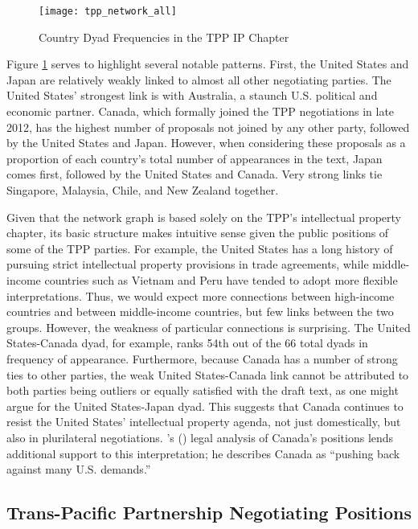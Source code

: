 \documentclass[12pt]{article}
\def\citeapos#1{\citeauthor{#1}'s (\citeyear{#1})}
\begin{document}
\begin{figure}
\caption{Country Dyad Frequencies in the TPP IP Chapter}
\label{fig_tpp_network_graph}
\centering
\texttt{[image: tpp\_network\_all]}
\end{figure}

Figure \ref{fig_tpp_network_graph} serves to highlight several notable patterns. First, the 
United States and Japan are relatively 
weakly linked to almost all other negotiating parties. The United States' strongest link is with 
Australia, a staunch U.S. political and economic partner. Canada, which formally joined the TPP 
negotiations in late 2012, has the highest number of proposals not joined by any other party, followed 
by the United States and Japan. However, when considering these proposals as a proportion of each 
country's total number of appearances in the text, Japan comes first, followed by the United States 
and Canada. Very strong links tie Singapore, Malaysia, Chile, and New Zealand together.

Given that the network graph is based solely on the TPP's intellectual property chapter, 
its basic structure makes intuitive sense given the public positions of some of the TPP parties. 
For example, the United States has a long history of pursuing strict intellectual property provisions 
in trade agreements, while middle-income countries such as Vietnam and Peru have tended to adopt more 
flexible interpretations. Thus, we would expect more connections between high-income countries and between 
middle-income countries, but few links between the two groups. However, the weakness of particular 
connections is surprising. The United States-Canada dyad, 
for example, ranks 54th out of the 66 total dyads in frequency of appearance. Furthermore, because Canada has a 
number of strong ties to other parties, the weak United States-Canada link cannot be attributed to 
both parties being outliers or equally satisfied with the draft text, as one might argue for the 
United States-Japan dyad. This suggests that Canada continues to resist the United States' intellectual property 
agenda, not just domestically, but also in plurilateral negotiations. \citeapos{michael_geist2013trans} legal analysis of Canada's positions lends additional 
support to this interpretation; he describes Canada as ``pushing back against many U.S. demands.''

\subsection*{Trans-Pacific Partnership Negotiating Positions}
\label{tpp_np}
\end{document}
